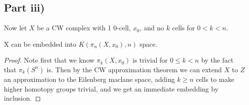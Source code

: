 \documentclass{article}
\begin{document}
\subsection{Part iii)}
Now let $X$ be a CW complex with 1 0-cell, $x_0$, and no $k$ cells for $0<k<n$. 

\begin{prop}
X can be embedded into $K(\pi_n(X,x_0),n)$ space.
\end{prop}
\begin{proof}
Note first that we know $\pi_k(X,x_0)$ is trivial for $0 \leq k < n$ by the fact that $\pi_k(S^n)$ is. Then by the CW approximation theorem we can extend $X$ to $Z$ an approximation to the Eilenberg maclane space, adding $k\geq n$ cells to make higher homotopy groups trivial, and we get an immediate embedding by inclusion.
\end{proof}

\end{document}
